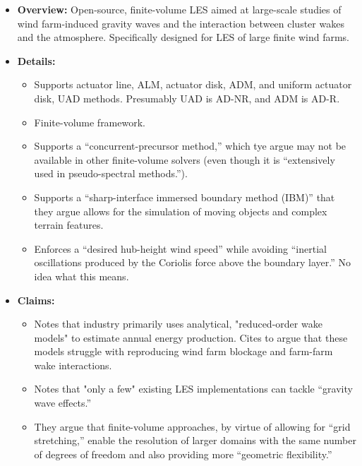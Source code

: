 \documentclass[12pt]{article}
\begin{document}
\begin{itemize}
    \item \textbf{Overview:} Open-source, finite-volume LES aimed at
        large-scale studies of wind farm-induced gravity waves and the
        interaction between cluster wakes and the atmosphere. Specifically
        designed for LES of large finite wind farms.
    \item \textbf{Details:} 
    \begin{itemize}
        \item Supports actuator line, ALM, actuator disk, ADM, and uniform
            actuator disk, UAD methods. Presumably UAD is AD-NR, and ADM is
            AD-R.
        \item Finite-volume framework.
        \item Supports a ``concurrent-precursor method,'' which tye argue may
            not be available in other finite-volume solvers (even though it is
            ``extensively used in pseudo-spectral methods.'').
        \item Supports a ``sharp-interface immersed boundary method (IBM)''
            that they argue allows for the simulation of moving objects and
            complex terrain features.
        \item Enforces a ``desired hub-height wind speed'' while avoiding ``inertial oscillations
            produced by the Coriolis force above the boundary layer.'' No idea what this means.
    \end{itemize}
    \item \textbf{Claims:}
        \begin{itemize}
        \item Notes that industry primarily uses analytical, "reduced-order wake models"
            to estimate annual energy production.
            Cites \cite{nygaardLargescaleBenchmarkingWake2022} to argue that
            these models struggle with reproducing wind farm blockage and
            farm-farm wake interactions.
        \item Notes that "only a few" existing LES implementations can tackle
            ``gravity wave effects.''
        \item They argue that finite-volume approaches, by virtue of allowing for ``grid stretching,''
            enable the resolution of larger domains with the same number of degrees of freedom
            and also providing more ``geometric flexibility.''
        \end{itemize}
\end{itemize}


\newpage

\printbibliography
\end{document}
